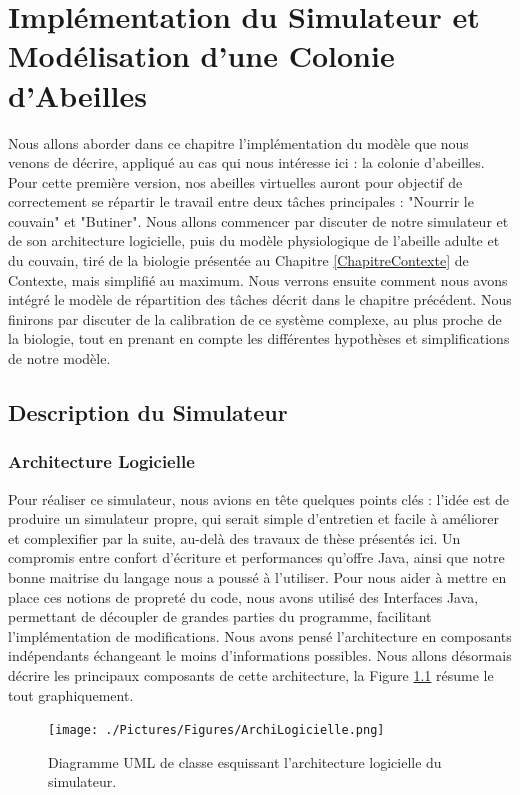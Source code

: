\chapter{Implémentation du Simulateur et Modélisation d'une Colonie d'Abeilles}
\label{ChapitrePropSMA}

	Nous allons aborder dans ce chapitre l'implémentation du modèle que nous venons de décrire, appliqué au cas qui nous intéresse ici : la colonie d'abeilles. Pour cette première version, nos abeilles virtuelles auront pour objectif de correctement se répartir le travail entre deux tâches principales : "Nourrir le couvain" et "Butiner". Nous allons commencer par discuter de notre simulateur et de son architecture logicielle, puis du modèle physiologique de l'abeille adulte et du couvain, tiré de la biologie présentée au Chapitre \ref{ChapitreContexte} de Contexte, mais simplifié au maximum. Nous verrons ensuite comment nous avons intégré le modèle de répartition des tâches décrit dans le chapitre précédent. Nous finirons par discuter de la calibration de ce système complexe, au plus proche de la biologie, tout en prenant en compte les différentes hypothèses et simplifications de notre modèle.
	
	\section{Description du Simulateur}
		\subsection{Architecture Logicielle}
			Pour réaliser ce simulateur, nous avions en tête quelques points clés : l'idée est de produire un simulateur propre, qui serait simple d'entretien et facile à améliorer et complexifier par la suite, au-delà des travaux de thèse présentés ici. Un compromis entre confort d'écriture et performances qu'offre Java, ainsi que notre bonne maitrise du langage nous a poussé à l'utiliser. Pour nous aider à mettre en place ces notions de propreté du code, nous avons utilisé des Interfaces Java, permettant de découpler de grandes parties du programme, facilitant l'implémentation de modifications. Nous avons pensé l'architecture en composants indépendants échangeant le moins d'informations possibles. Nous allons désormais décrire les principaux composants de cette architecture, la Figure \ref{ArchiLogicielle} résume le tout graphiquement.
			
			\begin{figure}
			\centering
			\texttt{[image: ./Pictures/Figures/ArchiLogicielle.png]}
			\caption{Diagramme UML de classe esquissant l'architecture logicielle du simulateur.}
			\label{ArchiLogicielle}
			\end{figure}
			

